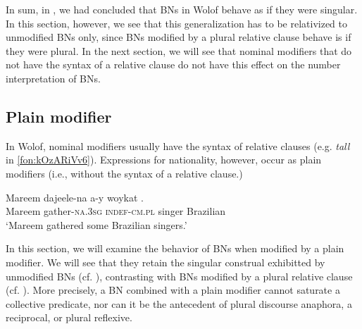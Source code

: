\documentclass[output=paper]{langscibook}
\begin{document}
			\z
		\ex
	    \label{fon:kOzARiVv6GaPpe}
					\label{fon:kOzARiVv6}
			\z
		\z
		
\noindent In sum, in , we had concluded that BNs in Wolof behave as if they were singular. In this section, however, we see that this generalization has to be relativized to unmodified BNs only, since BNs modified by a plural relative clause behave is if they were plural. In the next section, we will see that nominal modifiers that do not have the syntax of a relative clause do not have this effect on the number interpretation of BNs.

\subsection{Plain modifier}\largerpage
\label{fon:sec:BreZ}

In Wolof, nominal modifiers usually have the syntax of relative clauses (e.g. \textit{tall} in \ref{fon:kOzARiVv6}). Expressions for nationality, however, occur as plain modifiers (i.e., without the syntax of a relative clause.)
		
		\ea \gll	Mareem dajeele-na a-y woykat .\\
				Mareem gather-\textsc{na.3sg} \textsc{indef-cm.pl} singer Brazilian\\
				\glt `Mareem gathered some Brazilian singers.'\label{fon:gEntToRrRSeAa3}
		\z
		
	
	
	\noindent In this section, we will examine the behavior of BNs when modified by a plain modifier. We will see that they retain the singular construal exhibitted by unmodified BNs (cf. ), contrasting with BNs modified by a plural relative clause (cf. ). More precisely, a BN combined with a plain modifier cannot saturate a collective predicate, nor can it be the antecedent of plural discourse anaphora, a reciprocal, or plural reflexive.
	
\end{document}
